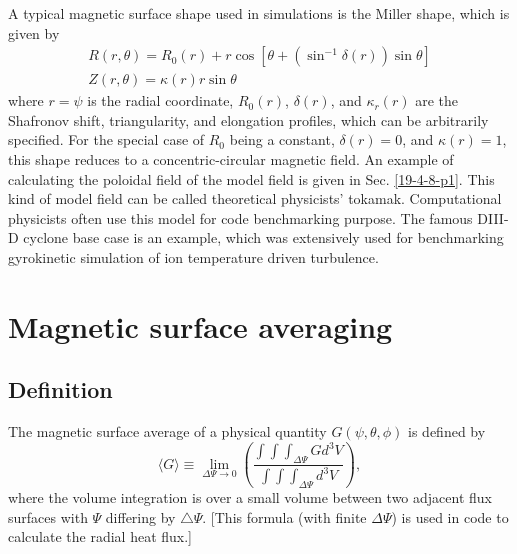 \documentclass{llncs}
\newcommand{\tmtexttt}[1]{\text{{\ttfamily{#1}}}}
\begin{document}
A typical magnetic surface shape used in simulations is the Miller shape,
which is given by
\begin{equation}
  \begin{array}{l}
    R (r, \theta) = R_0 (r) + r \cos [\theta + (\sin^{- 1} \delta (r)) \sin
    \theta]\\
    Z (r, \theta) = \kappa (r) r \sin \theta
  \end{array}
\end{equation}
where $r = \psi$ is the radial coordinate, $R_0 (r)$, $\delta (r)$, and
$\kappa_r (r)$ are the Shafronov shift, triangularity, and elongation
profiles, which can be arbitrarily specified. For the special case of $R_0$
being a constant, $\delta (r) = 0$, and $\kappa (r) = 1$, this shape reduces
to a concentric-circular magnetic field. An example of calculating the
poloidal field of the model field is given in Sec. \ref{19-4-8-p1}. This kind
of model field can be called theoretical physicists' tokamak. Computational
physicists often use this model for code benchmarking purpose. The famous
DIII-D cyclone base case is an example, which was extensively used for
benchmarking gyrokinetic simulation of ion temperature driven turbulence.

\section{Magnetic surface averaging}

\subsection{Definition}

The magnetic surface average of a physical quantity $G (\psi, \theta, \phi)$
is defined by
\begin{equation}
  \label{6-14-2} \langle G \rangle \equiv \lim_{\Delta \Psi \rightarrow 0}
  \left( \frac{\int \int \int_{\Delta \Psi} G d^3 V}{\int \int \int_{\Delta
  \Psi} d^3 V} \right),
\end{equation}
where the volume integration is over a small volume between two adjacent flux
surfaces with $\Psi$ differing by $\triangle \Psi$. [This formula (with finite
$\Delta \Psi$) is used in \tmtexttt{TEK} code to calculate the radial heat
flux.]
\end{document}
